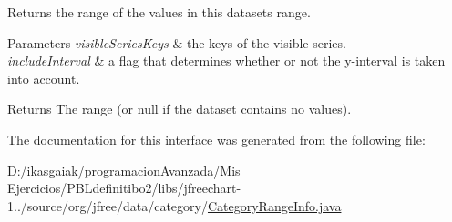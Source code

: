 Returns the range of the values in this dataset\textquotesingle{}s range.


\begin{DoxyParams}{Parameters}
{\em visible\+Series\+Keys} & the keys of the visible series. \\
\hline
{\em include\+Interval} & a flag that determines whether or not the y-\/interval is taken into account.\\
\hline
\end{DoxyParams}
\begin{DoxyReturn}{Returns}
The range (or {\ttfamily null} if the dataset contains no values). 
\end{DoxyReturn}


The documentation for this interface was generated from the following file\+:\begin{DoxyCompactItemize}
\item 
D\+:/ikasgaiak/programacion\+Avanzada/\+Mis Ejercicios/\+P\+B\+Ldefinitibo2/libs/jfreechart-\/1../source/org/jfree/data/category/\mbox{\hyperlink{_category_range_info_8java}{Category\+Range\+Info.\+java}}\end{DoxyCompactItemize}
